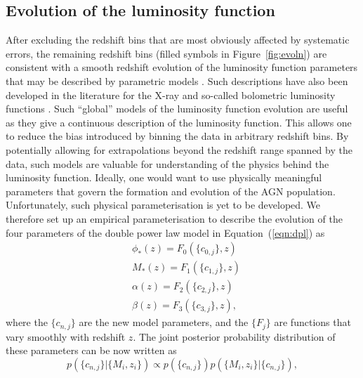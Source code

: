 \documentclass[fleqn,usenatbib]{mnras}
\begin{document}
\subsection{Evolution of the luminosity function}
\label{sec:global}

After excluding the redshift bins that are most obviously affected by
systematic errors, the remaining redshift bins (filled symbols in
Figure~\ref{fig:evoln}) are consistent with a smooth redshift
evolution of the luminosity function parameters that may be described
by parametric models \citep{1976A&A....53...15M, 1983ApJ...269..352S,
  1988ApJ...325...92K, 1988MNRAS.235..935B, 1993ApJ...406L..43H,
  1994ApJ...421..412W, 1995AJ....110...68S, 1995AJ....110.2553K,
  1995ApJ...438..623P, 2000MNRAS.317.1014B, 2001AJ....121...54F,
  2006AJ....131.2766R, 2007A&A...472..443B, 2009MNRAS.399.1755C,
  2013ApJ...773...14R, 2013A&A...551A..29P}.  Such descriptions have
also been developed in the literature for the X-ray
\citep[e.g.,][]{2015MNRAS.451.1892A} and so-called bolometric
luminosity functions \citep[e.g.,][]{2007ApJ...654..731H}.  Such
``global'' models of the luminosity function evolution are useful as
they give a continuous description of the luminosity function.  This
allows one to reduce the bias introduced by binning the data in
arbitrary redshift bins.  By potentially allowing for extrapolations
beyond the redshift range spanned by the data, such models are
valuable for understanding of the physics behind the luminosity
function.  Ideally, one would want to use physically meaningful
parameters that govern the formation and evolution of the AGN
population.  Unfortunately, such physical parameterisation is yet to
be developed.  We therefore set up an empirical parameterisation to
describe the evolution of the four parameters of the double power law
model in Equation~(\ref{eqn:dpl}) as 
\begin{align}
  &\phi_*(z) = F_0(\{c_{0,j}\}, z)\nonumber\\
  &M_*(z) = F_1(\{c_{1,j}\}, z)\nonumber\\
  &\alpha(z) = F_2(\{c_{2,j}\}, z)\nonumber\\
  &\beta(z) = F_3(\{c_{3,j}\}, z),
  \label{eqn:global}
\end{align}
where the $\{c_{n,j}\}$ are the new model parameters, and the $\{F_j\}$
are functions that vary smoothly with redshift $z$.  The joint
posterior probability distribution of these parameters can be now
written as
\begin{equation}
  p(\{c_{n,j}\} | \{M_i, z_i\}) \propto p(\{c_{n,j}\})p(\{M_i, z_i\} | \{c_{n,j}\}),
\end{equation}
\end{document}
